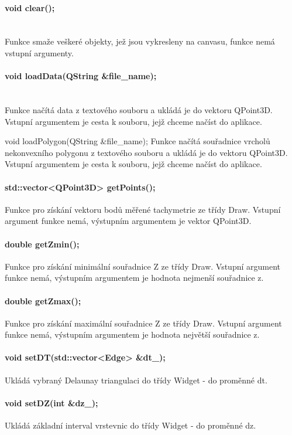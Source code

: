 \documentclass[11pt]{article}
\begin{document}
\paragraph{void clear();}\mbox{}\\
Funkce smaže veškeré objekty, jež jsou vykresleny na canvasu, funkce nemá vstupní argumenty. 

\paragraph{void loadData(QString \&file\_name);}\mbox{}\\
Funkce načítá data z textového souboru a ukládá je do vektoru QPoint3D. Vstupní argumentem je cesta k souboru, jejž chceme načíst do aplikace.   

void loadPolygon(QString \&file\_name);
Funkce načítá souřadnice vrcholů nekonvexního polygonu z textového souboru a ukládá je do vektoru QPoint3D. Vstupní argumentem je cesta k souboru, jejž chceme načíst do aplikace. 

\paragraph {std::vector<QPoint3D> getPoints();}
Funkce pro získání vektoru bodů měřené tachymetrie ze třídy Draw. Vstupní argument funkce nemá, výstupním argumentem je vektor QPoint3D.

\paragraph {double getZmin();}
Funkce pro získání minimální souřadnice Z ze třídy Draw. Vstupní argument funkce nemá, výstupním argumentem je hodnota nejmenší souřadnice z.

\paragraph {double getZmax();}
Funkce pro získání maximální souřadnice Z ze třídy Draw. Vstupní argument funkce nemá, výstupním argumentem je hodnota největší souřadnice z.

\paragraph {void setDT(std::vector<Edge> \&dt\_);}
Ukládá vybraný Delaunay triangulaci do třídy Widget - do proměnné dt.

\paragraph {void setDZ(int \&dz\_);}
Ukládá základní interval vrstevnic do třídy Widget - do proměnné dz.
\end{document}
